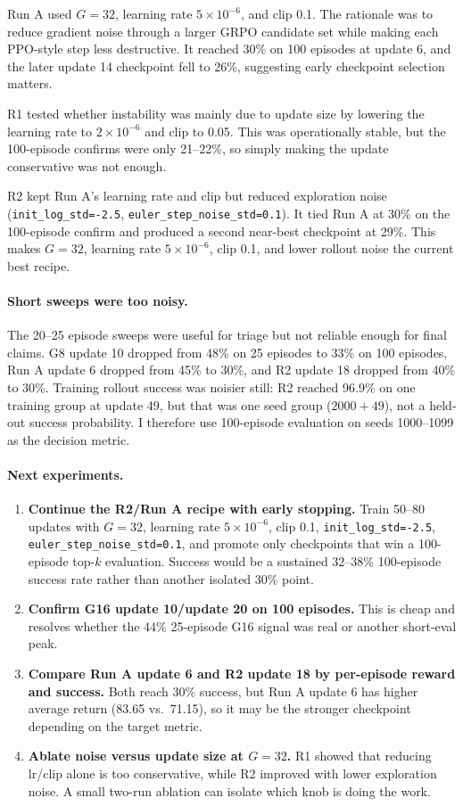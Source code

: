 Run A used $G=32$, learning rate $5{\times}10^{-6}$, and clip 0.1.  The rationale was to reduce gradient noise through a larger GRPO candidate set while making each PPO-style step less destructive.  It reached 30\% on 100 episodes at update 6, and the later update 14 checkpoint fell to 26\%, suggesting early checkpoint selection matters.

R1 tested whether instability was mainly due to update size by lowering the learning rate to $2{\times}10^{-6}$ and clip to 0.05.  This was operationally stable, but the 100-episode confirms were only 21--22\%, so simply making the update conservative was not enough.

R2 kept Run A's learning rate and clip but reduced exploration noise (\texttt{init\_log\_std=-2.5}, \texttt{euler\_step\_noise\_std=0.1}).  It tied Run A at 30\% on the 100-episode confirm and produced a second near-best checkpoint at 29\%.  This makes $G=32$, learning rate $5{\times}10^{-6}$, clip 0.1, and lower rollout noise the current best recipe.

\paragraph{Short sweeps were too noisy.}
The 20--25 episode sweeps were useful for triage but not reliable enough for final claims.  G8 update 10 dropped from 48\% on 25 episodes to 33\% on 100 episodes, Run A update 6 dropped from 45\% to 30\%, and R2 update 18 dropped from 40\% to 30\%.  Training rollout success was noisier still: R2 reached 96.9\% on one training group at update 49, but that was one seed group ($2000+49$), not a held-out success probability.  I therefore use 100-episode evaluation on seeds 1000--1099 as the decision metric.

\paragraph{Next experiments.}
\begin{enumerate}
  \item \textbf{Continue the R2/Run A recipe with early stopping.}  Train 50--80 updates with $G=32$, learning rate $5{\times}10^{-6}$, clip 0.1, \texttt{init\_log\_std=-2.5}, \texttt{euler\_step\_noise\_std=0.1}, and promote only checkpoints that win a 100-episode top-$k$ evaluation.  Success would be a sustained 32--38\% 100-episode success rate rather than another isolated 30\% point.
  \item \textbf{Confirm G16 update 10/update 20 on 100 episodes.}  This is cheap and resolves whether the 44\% 25-episode G16 signal was real or another short-eval peak.
  \item \textbf{Compare Run A update 6 and R2 update 18 by per-episode reward and success.}  Both reach 30\% success, but Run A update 6 has higher average return (83.65 vs.\ 71.15), so it may be the stronger checkpoint depending on the target metric.
  \item \textbf{Ablate noise versus update size at $G=32$.}  R1 showed that reducing lr/clip alone is too conservative, while R2 improved with lower exploration noise.  A small two-run ablation can isolate which knob is doing the work.
\end{enumerate}

